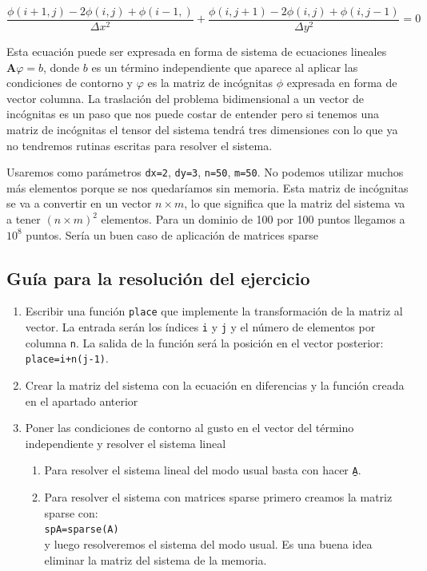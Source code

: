 $$\frac{\phi(i+1,j)-2\phi(i,j)+\phi(i-1,)}{\Delta
  x^{2}}+\frac{\phi(i,j+1)-2\phi(i,j)+\phi(i,j-1)}{\Delta y^{2}}=0$$

Esta ecuación puede ser expresada en forma de sistema de ecuaciones
lineales $\mathbf{A}\varphi=b$, donde $b$ es un término independiente
que aparece al aplicar las condiciones de contorno y $\varphi$ es la
matriz de incógnitas $\phi$ expresada en forma de vector columna.  La
traslación del problema bidimensional a un vector de incógnitas es un
paso que nos puede costar de entender pero si tenemos una matriz de
incógnitas el tensor del sistema tendrá tres dimensiones con lo que ya
no tendremos rutinas escritas para resolver el sistema.

Usaremos como parámetros \texttt{dx=2}, \texttt{dy=3}, \texttt{n=50},
\texttt{m=50}. No podemos utilizar muchos más elementos porque se nos
quedaríamos sin memoria. Esta matriz de incógnitas se va a convertir
en un vector $n\times m$, lo que significa que la matriz del sistema
va a tener $(n\times m)^{2}$ elementos. Para un dominio de 100 por 100
puntos llegamos a $10^{8}$ puntos. Sería un buen caso de aplicación de
matrices sparse


\subsection{Guía para la resolución del ejercicio}

\begin{enumerate}
\item Escribir una función \texttt{place} que implemente la transformación
de la matriz al vector. La entrada serán los índices \texttt{i} y
\texttt{j} y el número de elementos por columna \texttt{n}. La salida
de la función será la posición en el vector posterior: \texttt{place=i+n(j-1)}.
\item Crear la matriz del sistema con la ecuación en diferencias y la función
creada en el apartado anterior
\item Poner las condiciones de contorno al gusto en el vector del término
independiente y resolver el sistema lineal

\begin{enumerate}
\item Para resolver el sistema lineal del modo usual basta con hacer
  \texttt{A\b}.
\item Para resolver el sistema con matrices sparse primero creamos la
  matriz
  sparse con:\\
  \texttt{spA=sparse(A)}~\\
  y luego resolveremos el sistema del modo usual. Es una buena idea
  eliminar la matriz del sistema de la memoria.
\end{enumerate}
\end{enumerate}

